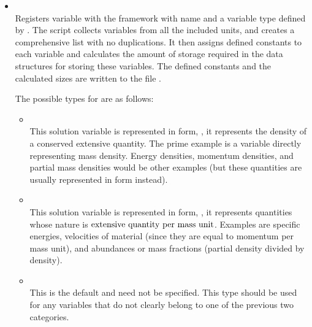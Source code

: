 \begin{itemize}
\item {}  
\\
Registers variable
with the framework with name  and a variable type%
 defined by
. The  script collects variables
from all the included units, and creates a comprehensive list with no
duplications. It then assigns defined constants to each variable and
calculates the amount of storage required in the data structures for
storing these variables. The defined constants and the calculated sizes
are written to the file .

The possible types for  are as follows:
\begin{itemize}
\item {}\\
This solution variable is represented in
form,
\ie, it represents the density of a conserved extensive quantity.
The prime example is a variable directly representing mass density.
Energy densities, momentum densities, and partial mass densities
would be other examples (but these quantities are usually represented in
 form instead).
\item {}\\
This solution variable is represented in
form,
\ie, it represents quantities whose nature is
$\hbox{extensive quantity}\,\mathop{\mathrm{per}}\,\hbox{mass unit}$.
Examples are specific energies, velocities of material (since
they are equal to momentum per mass unit), and abundances
or mass fractions (partial density divided by density).
\item {}\\
This is the default  and need not be specified.
This type should be used for any variables that do not clearly belong
to one of the previous two categories.
\begin{comment}
\item \code{ADVECT/NOADVECT}\\
A variable $Q$ with the \code{ADVECT} property obeys an advection equation,
\begin{equation}
\frac{\partial Q}{\partial t} + {\bf \nabla} \cdot (Q {\bf v}) = 0~.
\end{equation}
\item \code{RENORM/NORENORM}\\

\end{comment}
\end{itemize}
\end{itemize}
